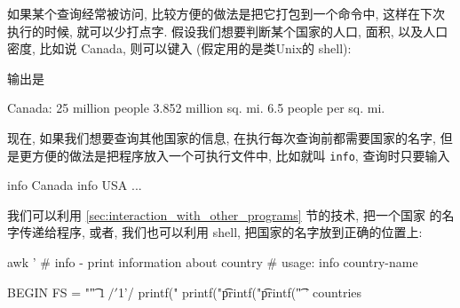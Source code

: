 如果某个查询经常被访问, 比较方便的做法是把它打包到一个命令中, 这样在下次
执行的时候, 就可以少打点字. 假设我们想要判断某个国家的人口, 面积, 以及人口 
密度, 比如说 Canada, 则可以键入 (假定用的是类Unix的 shell):
输出是 
\begin{shell}
    Canada:
        25 million people
        3.852 million sq. mi.
        6.5 people per sq. mi.
\end{shell}
现在, 如果我们想要查询其他国家的信息, 在执行每次查询前都需要国家的名字,
但是更方便的做法是把程序放入一个可执行文件中, 比如就叫 \verb'info',
查询时只要输入
\begin{awkcode}
    info Canada
    info USA
    ...
\end{awkcode}
我们可以利用 \ref{sec:interaction_with_other_programs} 节的技术, 把一个国家
的名字传递给程序, 或者, 我们也可以利用 shell, 把国家的名字放到正确的位置上:
\begin{awkcode}
    awk '
    # info - print information about country
    #    usage: info country-name

    BEGIN { FS = "\t" }
    $1 ~ /'$1'/ {
        printf("%
        printf("\t%
        printf("\t%
        printf("\t%
    }
    ' countries
\end{awkcode}
